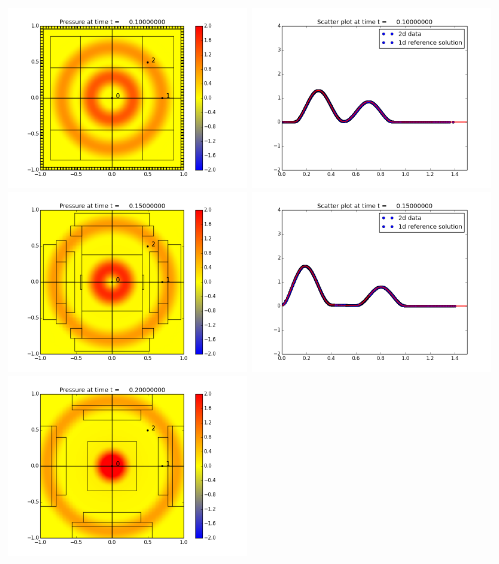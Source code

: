 \documentclass[11pt]{article}
\begin{document}
\vskip 10pt 
\includegraphics[width=0.475\textwidth]{frame0002fig0.png}
\includegraphics[width=0.475\textwidth]{frame0002fig3.png}
\vskip 10pt 
\includegraphics[width=0.475\textwidth]{frame0003fig0.png}
\includegraphics[width=0.475\textwidth]{frame0003fig3.png}
\vskip 10pt 
\includegraphics[width=0.475\textwidth]{frame0004fig0.png}
\end{document}
